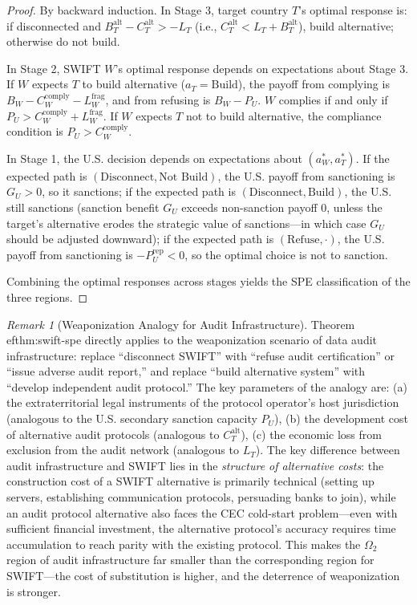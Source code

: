\documentclass[12pt,a4paper]{article}
\theoremstyle{definition}
\theoremstyle{remark}
\newtheorem{remark}{Remark}[section]
\begin{document}
\begin{proof}
By backward induction. In Stage 3, target country $T$'s optimal response is: if disconnected and $B_T^{\text{alt}} - C_T^{\text{alt}} > -L_T$ (i.e., $C_T^{\text{alt}} < L_T + B_T^{\text{alt}}$), build alternative; otherwise do not build.

In Stage 2, SWIFT $W$'s optimal response depends on expectations about Stage 3. If $W$ expects $T$ to build alternative ($a_T = \text{Build}$), the payoff from complying is $B_W - C_W^{\text{comply}} - L_W^{\text{frag}}$, and from refusing is $B_W - P_U$. $W$ complies if and only if $P_U > C_W^{\text{comply}} + L_W^{\text{frag}}$. If $W$ expects $T$ not to build alternative, the compliance condition is $P_U > C_W^{\text{comply}}$.

In Stage 1, the U.S. decision depends on expectations about $(a_W^*, a_T^*)$. If the expected path is $(\text{Disconnect}, \text{Not Build})$, the U.S. payoff from sanctioning is $G_U > 0$, so it sanctions; if the expected path is $(\text{Disconnect}, \text{Build})$, the U.S. still sanctions (sanction benefit $G_U$ exceeds non-sanction payoff 0, unless the target's alternative erodes the strategic value of sanctions---in which case $G_U$ should be adjusted downward); if the expected path is $(\text{Refuse}, \cdot)$, the U.S. payoff from sanctioning is $-P_U^{\text{rep}} < 0$, so the optimal choice is not to sanction.

Combining the optimal responses across stages yields the SPE classification of the three regions.
\end{proof}

\begin{remark}[Weaponization Analogy for Audit Infrastructure]
Theorem~
ef{thm:swift-spe} directly applies to the weaponization scenario of data audit infrastructure: replace ``disconnect SWIFT'' with ``refuse audit certification'' or ``issue adverse audit report,'' and replace ``build alternative system'' with ``develop independent audit protocol.'' The key parameters of the analogy are: (a) the extraterritorial legal instruments of the protocol operator's host jurisdiction (analogous to the U.S. secondary sanction capacity $P_U$), (b) the development cost of alternative audit protocols (analogous to $C_T^{\text{alt}}$), (c) the economic loss from exclusion from the audit network (analogous to $L_T$). The key difference between audit infrastructure and SWIFT lies in the \textit{structure of alternative costs}: the construction cost of a SWIFT alternative is primarily technical (setting up servers, establishing communication protocols, persuading banks to join), while an audit protocol alternative also faces the CEC cold-start problem---even with sufficient financial investment, the alternative protocol's accuracy requires time accumulation to reach parity with the existing protocol. This makes the $\Omega_2$ region of audit infrastructure far smaller than the corresponding region for SWIFT---the cost of substitution is higher, and the deterrence of weaponization is stronger.
\end{remark}
\end{document}
